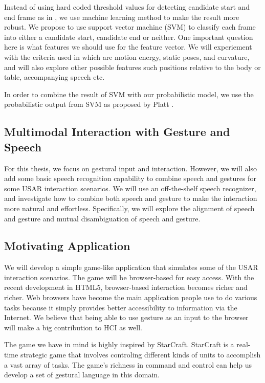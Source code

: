 Instead of using hard coded threshold values for detecting candidate
start and end frame as in \cite{kang04}, we use machine learning method to make
the result more robust. We propose to use support vector machine (SVM) to
classify each frame into either a candidate start, candidate end or neither. One
important question here is what features we should use for the feature vector.
We will experiement with the criteria used in \cite{kang04} which are motion
energy, static poses, and curvature, and will also explore other possible
features such positions relative to the body or table, accompanying speech etc.

In order to combine the result of SVM with our probabilistic model, we use the
probabilistic output from SVM as proposed by Platt \cite{platt99}.

\subsection{Multimodal Interaction with Gesture and Speech} 
For this thesis, we focus on gestural input and interaction. However, we will
also add some basic speech recognition capability to combine speech and gestures
for some USAR interaction scenarios. We will use an off-the-shelf speech 
recognizer, and investigate how to combine both speech and gesture to make
the interaction more natural and effortless. Specifically, we will explore the
alignment of speech and gesture and mutual disambiguation of speech and gesture. 

\subsection{Motivating Application}
We will develop a simple game-like application that simulates some of the USAR
interaction scenarios. The game will be browser-based for easy access. With the
recent development in HTML5, browser-based interaction becomes richer and
richer. Web browsers have become the main application people use to do various
tasks because it simply provides better accessibility to information via the
Internet. We believe that being able to use gesture as an input to the browser
will make a big contribution to HCI as well.

The game we have in mind is highly inspired by StarCraft. StarCraft is a
real-time strategic game that involves controling different kinds of units to
accomplish a vast array of tasks. The game's richness in command
and control can help us develop a set of gestural language in this domain.

